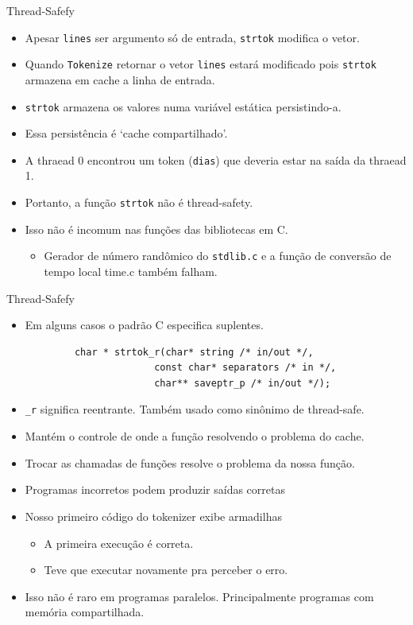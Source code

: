 	\begin{frame}{Thread-Safefy}
		\begin{itemize}
			\item Apesar {\tt lines} ser argumento só de entrada, {\tt strtok} modifica o vetor.
			\item Quando {\tt Tokenize} retornar o vetor {\tt lines} estará modificado pois {\tt strtok} armazena em cache a linha de entrada. 
			\item {\tt strtok} armazena os valores numa variável estática persistindo-a. 
			\item Essa persistência é `cache compartilhado'.
			\item A thraead 0 encontrou um token ({\tt dias}) que deveria estar na saída da thraead 1.
						\bigskip
			\item Portanto, a função {\tt strtok} não é thread-safety.
			\item Isso não é incomum nas funções das bibliotecas em C.
			\begin{itemize}
				\item Gerador de número randômico do {\tt stdlib.c} e a função de conversão de tempo local {time.c} também falham.
			\end{itemize}
		\end{itemize}
	\end{frame}

	\begin{frame}[fragile]{Thread-Safefy}
		\begin{itemize}
			\item Em alguns casos o  padrão C especifica suplentes.	
		\end{itemize}

		\begin{verbatim}
			char * strtok_r(char* string /* in/out */, 
						  const char* separators /* in */, 
						  char** saveptr_p /* in/out */);
		\end{verbatim}

		\begin{itemize}
			\item {\tt \_r} significa reentrante. Também usado como sinônimo de thread-safe.
			\item Mantém o controle de onde a função resolvendo o problema do cache.
			\item Trocar as chamadas de funções resolve o problema da nossa função.
					\bigskip
			\item Programas incorretos podem produzir saídas corretas
			\item Nosso primeiro código do tokenizer exibe armadilhas
			\begin{itemize}
				\item A primeira execução é correta.
				\item Teve que executar novamente pra perceber o erro.
			\end{itemize}
			\item Isso não é raro em programas paralelos. Principalmente programas com memória compartilhada.
		\end{itemize}
\end{frame}